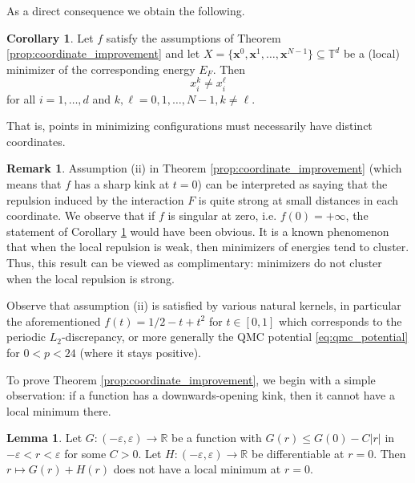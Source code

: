 \documentclass[a4paper,12pt]{article}
\numberwithin{equation}{section}
\theoremstyle{definition}
\newtheorem{lem}[thm]{Lemma}
\newtheorem{cor}[thm]{Corollary}
\newtheorem*{rem*}{Remark}
\newcommand{\bx}{\mathbf{x}}
\newcommand{\bbT}{\mathbb{T}}
\newcommand{\sbse}{\subseteq}
\begin{document}
As a direct consequence we obtain the following.

\begin{cor}\label{c.noequal}
    Let $f$ satisfy the assumptions of Theorem \ref{prop:coordinate_improvement} and let $X = \{\bx^0, \bx^1, \dots, \bx^{N-1}\} \sbse \bbT^d$ be a (local) minimizer of the corresponding energy $E_F$. Then
    $$
    x_i^k \neq x_i^\ell
    $$
    for all $i = 1, \dots, d$ and $k, \ell = 0, 1, \dots, N-1, k \neq \ell$.
\end{cor}


That is, points in minimizing configurations must necessarily have distinct coordinates.

\begin{rem*}
Assumption (ii) in Theorem  \ref{prop:coordinate_improvement} (which means that $f$ has a sharp kink at $t=0$) can be interpreted as saying that the repulsion induced by the interaction $F$ is quite strong at small distances in each coordinate. 
We observe that if $f$ is singular at zero, i.e. $f(0) = + \infty$, the statement of Corollary \ref{c.noequal}  would have been obvious. It is a known phenomenon \cite{CFP} that when the local repulsion is weak, then minimizers of energies tend to cluster. Thus, this result can be viewed as complimentary: minimizers do not cluster when the local repulsion is strong. %

Observe that assumption (ii) is satisfied by various natural kernels, in particular the aforementioned $f(t) = 1/2 - t + t^2$ for $t\in [0,1]$ which corresponds to the periodic $L_2$-discrepancy, or more generally the QMC potential \eqref{eq:qmc_potential} for $0 < p < 24$ (where it stays positive). 
\end{rem*}


To prove Theorem  \ref{prop:coordinate_improvement}, we begin with a simple   observation: if a function has a downwards-opening kink, then it  cannot have a local minimum there.


\begin{lem} \label{lem:basic_calculcus_lemma}
	Let $G: (-\varepsilon, \varepsilon) \rightarrow \mathbb{R}$ be a function with $G(r) \leq G(0) - C|r|$ in $-\varepsilon < r < \varepsilon$ for some $C > 0$. Let $H: (-\varepsilon, \varepsilon) \rightarrow \mathbb{R}$ be   differentiable at $r = 0$. Then $r \mapsto G(r) + H(r)$ does not have a local minimum at $r = 0$.
\end{lem}
\end{document}
